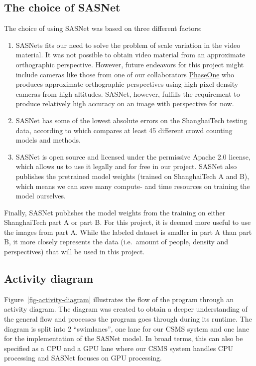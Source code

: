 \documentclass[
]{article}
\begin{document}
\hypertarget{the-choice-of-sasnet}{%
\subsection{The choice of SASNet}\label{the-choice-of-sasnet}}

The choice of using SASNet was based on three different factors:

\begin{enumerate}
\def\labelenumi{\arabic{enumi}.}
\item
  SASNets fits our need to solve the problem of scale variation in the
  video material. It was not possible to obtain video material from an
  approximate orthographic perspective. However, future endeavors for
  this project might include cameras like those from one of our
  collaborators \href{https://www.phaseone.com/}{PhaseOne} who produces
  approximate orthographic perspectives using high pixel density cameras
  from high altitudes. SASNet, however, fulfills the requirement to
  produce relatively high accuracy on an image with perspective for now.
\item
  SASNet has some of the lowest absolute errors on the ShanghaiTech
  testing data, according to \textcite{gjy3035_awesome_crowd_counting}
  which compares at least 45 different crowd counting models and
  methods.
\item
  SASNet is open source and licensed under the permissive Apache 2.0
  license, which allows us to use it legally and for free in our
  project. SASNet also publishes the pretrained model weights (trained
  on ShanghaiTech A and B), which means we can save many compute- and
  time resources on training the model ourselves.
\end{enumerate}

Finally, SASNet publishes the model weights from the training on either
ShanghaiTech part A or part B. For this project, it is deemed more
useful to use the images from part A. While the labeled dataset is
smaller in part A than part B, it more closely represents the data
(i.e.~amount of people, density and perspectives) that will be used in
this project.

\hypertarget{activity-diagram}{%
\subsection{Activity diagram}\label{activity-diagram}}

Figure~\ref{fig-activity-diagram} illustrates the flow of the program
through an activity diagram. The diagram was created to obtain a deeper
understanding of the general flow and processes the program goes through
during its runtime. The diagram is split into 2 ``swimlanes'', one lane
for our CSMS system and one lane for the implementation of the SASNet
model. In broad terms, this can also be specified as a CPU and a GPU
lane where our CSMS system handles CPU processing and SASNet focuses on
GPU processing.
\end{document}

